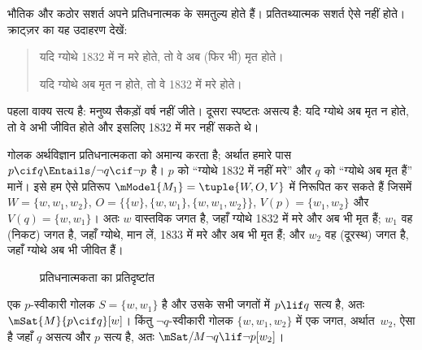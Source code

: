 \documentclass[../../../include/open-logic-section]{subfiles}
\begin{document}


भौतिक और कठोर सशर्त अपने प्रतिधनात्मक के समतुल्य होते हैं। प्रतितथ्यात्मक
सशर्त ऐसे नहीं होते। क्राट्ज़र का यह उदाहरण देखें:
\begin{quote}
  यदि ग्योथे 1832 में न मरे होते, तो वे अब (फिर भी) मृत होते।

  यदि ग्योथे अब मृत न होते, तो वे 1832 में मरे होते।
\end{quote}
पहला वाक्य सत्य है: मनुष्य सैकड़ों वर्ष नहीं जीते। दूसरा स्पष्टतः असत्य
है: यदि ग्योथे अब मृत न होते, तो वे अभी जीवित होते और इसलिए 1832 में मर
नहीं सकते थे।

\begin{ex}
  गोलक अर्थविज्ञान प्रतिधनात्मकता को अमान्य करता है; अर्थात हमारे पास $p
  \cif q \Entails/ \lnot q \cif \lnot p$ है। $p$ को ``ग्योथे 1832 में
  नहीं मरे'' और $q$ को ``ग्योथे अब मृत हैं'' मानें। इसे हम ऐसे प्रतिरूप
  $\mModel{M_1} = \tuple{W, O, V}$ में निरूपित कर सकते हैं जिसमें $W =
  \{w, w_1, w_2\}$, $O = \{\{w\}, \{w, w_1\}, \{w, w_1, w_2\}\}$,
  $V(p) = \{w_1, w_2\}$ और $V(q) = \{w, w_1\}$। अतः $w$ वास्तविक
  जगत है, जहाँ ग्योथे 1832 में मरे और अब भी मृत हैं; $w_1$ वह (निकट)
  जगत है, जहाँ ग्योथे, मान लें, 1833 में मरे और अब भी मृत हैं; और $w_2$
  वह (दूरस्थ) जगत है, जहाँ ग्योथे अब भी जीवित हैं।
\begin{figure}
\begin{center}
\caption{प्रतिधनात्मकता का प्रतिदृष्टांत}
\end{center}
\end{figure}
एक $p$-स्वीकारी गोलक $S = \{w, w_1\}$ है और उसके सभी जगतों में
$p \lif q$ सत्य है, अतः $\mSat{M}{p \cif q}[w]$। किंतु $\lnot q$-स्वीकारी
गोलक $\{w, w_1, w_2\}$ में एक जगत, अर्थात~$w_2$, ऐसा है जहाँ $q$ असत्य
और $p$ सत्य है, अतः $\mSat/{M}{\lnot q \lif \lnot p}[w_2]$।
\end{ex}
\end{document}
